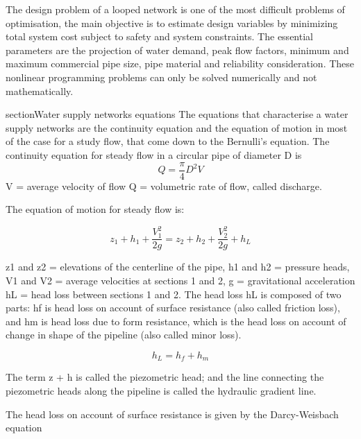 The design problem of a looped network is one of the most difficult problems of optimisation, 
the main objective is to estimate design variables by minimizing total system cost subject to 
safety and system constraints. The essential parameters are the projection of water demand, peak 
flow factors, minimum and maximum commercial pipe size, pipe material and reliability 
consideration. These nonlinear programming problems can only be solved numerically and not 
mathematically.

section{Water supply networks equations}
The equations that characterise a water supply networks are the continuity equation and the
equation of motion in most of the case for a study flow, that come down to the Bernulli's 
equation.
\bigbreak
The continuity equation for steady flow in a circular pipe of diameter D is
\begin{equation}
  Q=\frac{\pi}{4}D^{2}V  
\end{equation}
V = average velocity of flow
Q = volumetric rate of flow, called discharge.


The equation of motion for steady flow is:


\begin{equation}
  z_{1}+  h_{1}+  \frac{V_{1}^{2}}{2g}=z_{2}+ h_{2}+\frac{V_{2}^{2}}{2g}+  h_{L}  
\end{equation}

z1 and z2 = elevations of the centerline of the pipe, 
h1 and h2 = pressure heads,
V1 and V2 = average velocities at sections 1 and 2, 
g = gravitational acceleration
hL = head loss between sections 1 and 2.
The head loss hL is composed of two parts: hf  is head loss on account of surface resistance
(also called friction loss), and hm  is head loss due to form resistance, which is the
head loss on account of change in shape of the pipeline (also called minor loss).


\begin{equation}
   h_{L}= h_{f}+ h_{m} 
\end{equation}

The term z + h is called the piezometric head; and the line connecting the piezometric
heads along the pipeline is called the hydraulic gradient line.


\begin{figure}
    
\end{figure}

The head loss on account of surface resistance is given by the Darcy-Weisbach equation

